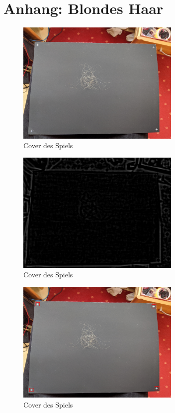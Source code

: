 \documentclass[german,a4paper, 12pt]{scrartcl}
\begin{document}
\section{Anhang: Blondes Haar}

\begin{figure}
	\centering
	\includegraphics[width=0.7\textwidth]{figBina/01foundDots.png}
	\caption[]{Cover des Spiels}
	\label{img:Bina01}
\end{figure}
\begin{figure}
	\centering
	\includegraphics[width=0.7\textwidth]{figBina/01match res.png}
	\caption[]{Cover des Spiels}
	\label{img:Bina01}
\end{figure}
\begin{figure}
	\centering
	\includegraphics[width=0.7\textwidth]{figBina/02foundDots.png}
	\caption[]{Cover des Spiels}
	\label{img:Bina01}
\end{figure}
\end{document}

